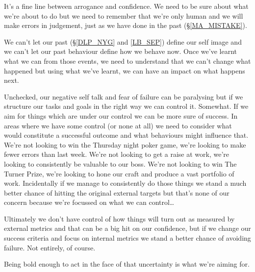 \cleardoublepage
\begin{multicols}{2}

It's a fine line between arrogance and confidence. We need to be sure about what we're about to do but we need to remember that we're only human and we will make errors in judgement, just as we have done in the past (\S \ref{MA_MISTAKE}). 

We can't let our past (\S \ref{DLP_NYG} and \ref{LB_SEP}) define our self image and we can't let our past behaviour define how we behave now. Once we've learnt what we can from those events, we need to understand that we can't change what happened but using what we've learnt, we can have an impact on what happens next.

Unchecked, our negative self talk and fear of failure can be paralysing but if we structure our tasks and goals in the right way we can control it. Somewhat. If we aim for things which are under our control we can be more sure of success. In areas where we have some control (or none at all) we need to consider what would constitute a successful outcome and what behaviours might influence that. We're not looking to win the Thursday night poker game, we're looking to make fewer errors than last week. We're not looking to get a raise at work, we're looking to consistently be valuable to our boss. We're not looking to win The Turner Prize, we're looking to hone our craft and produce a vast portfolio of work.
Incidentally if we manage to consistently do those things we stand a much better chance of hitting the original external targets but that's none of our concern because we're focussed on what we can control\ldots

Ultimately we don't have control of how things will turn out as measured by external metrics and that can be a big hit on our confidence, but if we change our success criteria and focus on internal metrics we stand a better chance of avoiding failure. Not entirely, of course.

Being bold enough to act in the face of that uncertainty is what we're aiming for.



\end{multicols}
\clearpage
